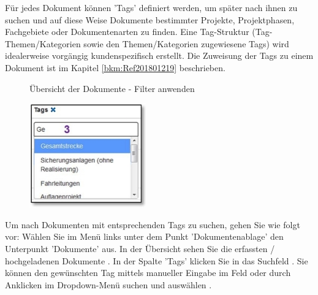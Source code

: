 Für jedes Dokument können 'Tags' definiert werden, um später nach ihnen zu suchen und auf diese Weise Dokumente bestimmter Projekte, Projektphasen, Fachgebiete oder Dokumentenarten zu finden. Eine Tag-Struktur (Tag-Themen/Kategorien sowie den Themen/Kategorien zugewiesene Tags) wird idealerweise vorgängig kundenspezifisch erstellt. Die Zuweisung der Tags zu einem Dokument ist im Kapitel \ref{bkm:Ref201801219} beschrieben.

\begin{figure}[H]
\caption{Übersicht der Dokumente - Filter anwenden}
\end{figure}

\begin{figure}
\vspace{-10pt}
\includegraphics[height=45mm]{../chapters/11_Dokumentenablage/pictures/11-2-8_DokTagHinzufuegen.jpg}
\end{figure}
Um nach Dokumenten mit entsprechenden Tags zu suchen, gehen Sie wie folgt vor:
Wählen Sie im Menü links unter dem Punkt 'Dokumentenablage' den Unterpunkt 'Dokumente' aus. In der Übersicht sehen Sie die erfassten / hochgeladenen Dokumente . In der Spalte 'Tags' klicken Sie in das Suchfeld . Sie können den gewünschten Tag mittels manueller Eingabe im Feld oder durch Anklicken im Dropdown-Menü suchen und auswählen .

\vspace{\baselineskip}

